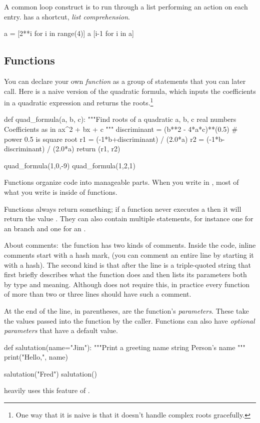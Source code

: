 A common loop construct is to run through a list
performing an action on each entry.
\python{} has a shortcut, \textit{list comprehension}.
\begin{pythonconsole}
a = [2**i for i in range(4)]
a
[i-1 for i in a]
\end{pythonconsole}



\subsection{Functions}
You can declare your own \textit{function} 
as a group of statements that you can later call.
Here is a naive version of the quadratic formula, which 
inputs the coefficients in a quadratic expression and returns the 
roots.\footnote{%
  One way that it is naive is that it doesn't handle complex roots gracefully.}
\begin{pythonconsole}
def quad_formula(a, b, c):
    """Find roots of a quadratic 
      a, b, c  real numbers Coefficients as in ax^2 + bx + c
    """
    discriminant = (b**2 - 4*a*c)**(0.5)  # power 0.5 is square root
    r1 = (-1*b+discriminant) / (2.0*a)
    r2 = (-1*b-discriminant) / (2.0*a)
    return (r1, r2)

quad_formula(1,0,-9)
quad_formula(1,2,1)
\end{pythonconsole}
Functions organize code into manageable parts.
When you write in \python{}, most of what you write
is inside of functions. 

Functions always return something; 
if a function never executes a  then it will
return the value .
They can also contain multiple  statements, for instance 
one for an  branch and one for an .

About comments:~the  function has two kinds of 
comments.
Inside the code, inline comments start with a hash mark, \inlinecode{\#}
(you can comment an entire line by starting 
it with a hash). 
The second kind is that
after the  line is a triple-quoted string that
first briefly describes
what the function does and then lists its parameters both by type and meaning.
Although \python{} does not require this, in practice every function
of more than two or three lines should have such a comment.

At the end of the  line, in parentheses, are
the function's \textit{parameters}. 
These take the values 
passed into the function by the caller.
Functions can also have \textit{optional parameters} that have a default value.
\begin{pythonconsole}
def salutation(name="Jim"):
    """Print a greeting
      name  string Person's name
    """
    print("Hello,", name)

salutation("Fred")
salutation()
\end{pythonconsole}
\noindent
\Sage{}  heavily uses this feature of \python{}.








